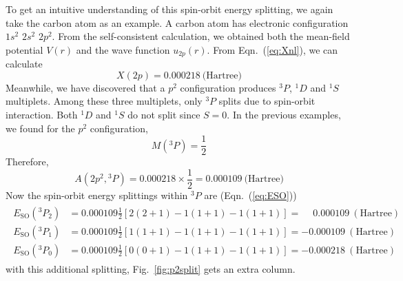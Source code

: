 To get an intuitive understanding of this spin-orbit energy splitting,
we again take the carbon atom as an example. A carbon atom has electronic
configuration $1s^2$ $2s^2$ $2p^2$. From the self-consistent calculation,
we obtained both the mean-field potential $V(r)$ and the wave function
$u_{2p}(r)$. From Eqn.~(\ref{eq:Xnl}), we can calculate
\begin{equation} \label{eq:Xcarbon}
X(2p) = 0.000218\ \text{(Hartree)}
\end{equation}
%
Meanwhile, we have discovered that a $p^2$ configuration produces
$^3P$, $^1D$ and $^1S$ multiplets. Among these three multiplets,
only $^3P$ splits due to spin-orbit interaction. Both $^1D$ and $^1S$
do not split since $S=0$. In the previous examples, we found
for the $p^2$ configuration,
\begin{equation}
M(^3P) = \frac{1}{2}
\end{equation}
%
Therefore,
\begin{equation}
A(2p^2,{^3P}) = 0.000218\times\frac{1}{2} = 0.000109\ \text{(Hartree)}
\end{equation}
Now the spin-orbit energy splittings within $^3P$ are (Eqn.~(\ref{eq:ESO}))
\begin{align}
\begin{split}
E_\text{SO}(^3P_2) & = 0.000109\frac{1}{2}[2(2+1)-1(1+1)-1(1+1)] = \phantom{-}0.000109\ (\text{Hartree}) \\
E_\text{SO}(^3P_1) & = 0.000109\frac{1}{2}[1(1+1)-1(1+1)-1(1+1)] = -0.000109\ (\text{Hartree}) \\
E_\text{SO}(^3P_0) & = 0.000109\frac{1}{2}[0(0+1)-1(1+1)-1(1+1)] = -0.000218\ (\text{Hartree})
\end{split}
\end{align}
with this additional splitting, Fig.~\ref{fig:p2split} gets an extra column.
